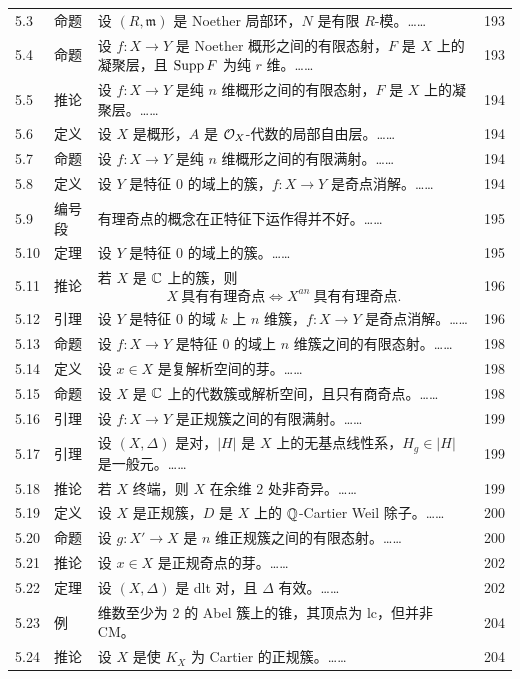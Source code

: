 \begin{longtable}{@{}p{}p{}p{}p{}@{}}
5.3 & 命题 & 设 $(R,\mathfrak{m})$ 是 Noether 局部环，$N$ 是有限 $R$-模。…… & 193 \\
5.4 & 命题 & 设 $f\colon X\to Y$ 是 Noether 概形之间的有限态射，$F$ 是 $X$ 上的凝聚层，且 $\operatorname{Supp} F$ 为纯 $r$ 维。…… & 193 \\
5.5 & 推论 & 设 $f\colon X\to Y$ 是纯 $n$ 维概形之间的有限态射，$F$ 是 $X$ 上的凝聚层。…… & 194 \\
5.6 & 定义 & 设 $X$ 是概形，$A$ 是 $\mathcal{O}_X$-代数的局部自由层。…… & 194 \\
5.7 & 命题 & 设 $f\colon X\to Y$ 是纯 $n$ 维概形之间的有限满射。…… & 194 \\
5.8 & 定义 & 设 $Y$ 是特征 $0$ 的域上的簇，$f\colon X\to Y$ 是奇点消解。…… & 194 \\
5.9 & 编号段 & 有理奇点的概念在正特征下运作得并不好。…… & 195 \\
5.10 & 定理 & 设 $Y$ 是特征 $0$ 的域上的簇。…… & 195 \\
5.11 & 推论 & 若 $X$ 是 $\mathbb{C}$ 上的簇，则 \[ X\ \text{具有有理奇点}\iff X^{an}\ \text{具有有理奇点}. \] & 196 \\
5.12 & 引理 & 设 $Y$ 是特征 $0$ 的域 $k$ 上 $n$ 维簇，$f\colon X\to Y$ 是奇点消解。…… & 196 \\
5.13 & 命题 & 设 $f\colon X\to Y$ 是特征 $0$ 的域上 $n$ 维簇之间的有限态射。…… & 198 \\
5.14 & 定义 & 设 $x\in X$ 是复解析空间的芽。…… & 198 \\
5.15 & 命题 & 设 $X$ 是 $\mathbb{C}$ 上的代数簇或解析空间，且只有商奇点。…… & 198 \\
5.16 & 引理 & 设 $f\colon X\to Y$ 是正规簇之间的有限满射。…… & 199 \\
5.17 & 引理 & 设 $(X,\Delta)$ 是对，$|H|$ 是 $X$ 上的无基点线性系，$H_g\in|H|$ 是一般元。…… & 199 \\
5.18 & 推论 & 若 $X$ 终端，则 $X$ 在余维 $2$ 处非奇异。…… & 199 \\
5.19 & 定义 & 设 $X$ 是正规簇，$D$ 是 $X$ 上的 $\mathbb{Q}$-Cartier Weil 除子。…… & 200 \\
5.20 & 命题 & 设 $g\colon X'\to X$ 是 $n$ 维正规簇之间的有限态射。…… & 200 \\
5.21 & 推论 & 设 $x\in X$ 是正规奇点的芽。…… & 202 \\
5.22 & 定理 & 设 $(X,\Delta)$ 是 dlt 对，且 $\Delta$ 有效。…… & 202 \\
5.23 & 例 & 维数至少为 $2$ 的 Abel 簇上的锥，其顶点为 lc，但并非 CM。 & 204 \\
5.24 & 推论 & 设 $X$ 是使 $K_X$ 为 Cartier 的正规簇。…… & 204 \\

\end{longtable}

